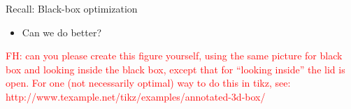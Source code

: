 










\iffalse


\begin{frame}{Recall: Black-box optimization}

\begin{figure}
    \centering
    
\end{figure}
\fhpause
\begin{itemize}
    \item Can we do better?
\end{itemize}
    
    \textcolor{red}{FH: can you please create this figure yourself, using the same picture for black box and looking inside the black box, except that for ``looking inside'' the lid is open. For one (not necessarily optimal) way to do this in tikz, see: http://www.texample.net/tikz/examples/annotated-3d-box/}
    
\end{frame}




